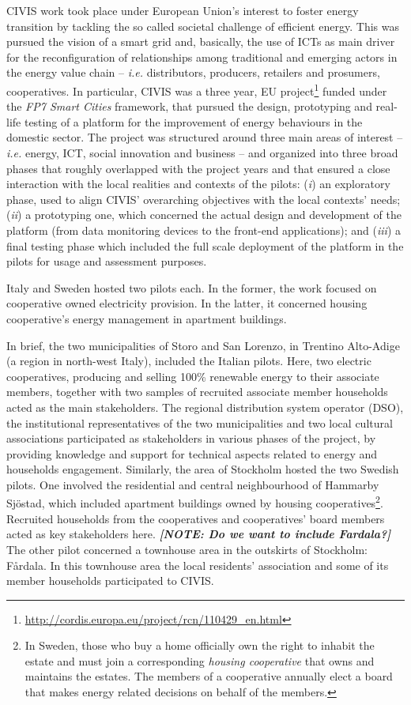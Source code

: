 CIVIS work took place under European Union’s interest to foster energy transition by tackling the so called societal challenge of efficient energy. 
This was pursued the vision of a smart grid and, basically, the use of ICTs as main driver for the
reconfiguration of relationships among traditional and emerging actors in the energy value chain -- \textit{i.e.} distributors, producers, retailers and prosumers, cooperatives.
In particular, CIVIS was a three year, EU project\footnote{\url{http://cordis.europa.eu/project/rcn/110429\_en.html}} funded under the \textit{FP7 Smart Cities} framework, that pursued the design,
prototyping and real-life testing of a platform for the improvement of energy behaviours in the domestic sector. The project was structured around three main areas
of interest -- \textit{i.e.} energy, ICT, social innovation and business -- and organized into three broad phases that roughly
overlapped with the project years and that ensured a close interaction with the local realities and contexts of
the pilots: (\textit{i}) an exploratory phase, used to align CIVIS’ overarching objectives with the local contexts’ needs;
(\textit{ii}) a prototyping one, which concerned the actual design and development of the platform (from data monitoring devices to the
front-end applications); and (\textit{iii}) a final testing phase which included the full scale deployment of the platform in the pilots for usage and assessment purposes.

Italy and Sweden hosted two pilots each. In the former, the work focused on cooperative owned electricity provision. In the latter, it
concerned housing cooperative's energy management in apartment buildings.

In brief, the two municipalities of Storo and San Lorenzo, in Trentino Alto-Adige (a region in north-west Italy), included the
Italian pilots. Here, two electric cooperatives, producing and selling 100\% renewable energy
to their associate members, together with two samples of recruited associate member households acted as the main stakeholders.
The regional distribution system operator (DSO), the institutional representatives of the two municipalities and two local cultural associations participated as
stakeholders in various phases of the project, by providing knowledge and support for technical aspects related
to energy and households engagement.
Similarly, the area of Stockholm hosted the two Swedish pilots. One involved the residential and central neighbourhood
of Hammarby Sj\"{o}stad, which included apartment buildings owned by housing cooperatives\footnote{In Sweden, those who buy a home officially own the right to inhabit the estate and must
join a corresponding \textit{housing cooperative} that owns and maintains the estates. The members of a cooperative
annually elect a board that makes energy related decisions on behalf of the members.}.
Recruited households from the cooperatives and cooperatives' board members acted
as key stakeholders here. \textbf{\textit{[NOTE: Do we want to include Fardala?]}} The other pilot concerned a townhouse area in the outskirts of Stockholm: F\aa{}rdala. In this townhouse
area the local residents’ association and some of its member households participated to CIVIS.

